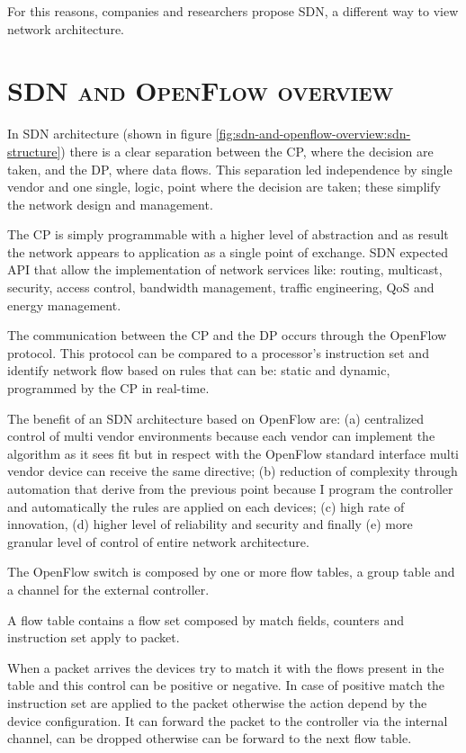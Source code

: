 For this reasons, companies and researchers propose \ac{SDN}, a different way to view network architecture.

\section*{\small \textsc{\ac{SDN} and OpenFlow overview}}
In \ac{SDN} architecture (shown in figure \ref{fig:sdn-and-openflow-overview:sdn-structure}) there is a clear separation between the \ac{CP}, where the decision are taken, and the \ac{DP}, where data flows. This separation led independence by single vendor and one single, logic, point where the decision are taken; these simplify the network design and management.

The \ac{CP} is simply programmable with a higher level of abstraction and as result the network appears to application as a single point of exchange.
\ac{SDN} expected \ac{API} that allow the implementation of network services like: routing, multicast, security, access control, bandwidth management, traffic engineering, \ac{QoS} and energy management.

The communication between the \ac{CP} and the \ac{DP} occurs through the OpenFlow protocol. This protocol can be compared to a processor's instruction set and identify network flow based on rules that can be: static and dynamic, programmed by the \ac{CP} in real-time.

The benefit of an \ac{SDN} architecture based on OpenFlow are: (a) centralized control of multi vendor environments because each vendor can implement the algorithm as it sees fit but in respect with the OpenFlow standard interface multi vendor device can receive the same directive; (b) reduction of complexity through automation that derive from the previous point because I program the controller and automatically the rules are applied on each devices; (c) high rate of innovation, (d) higher level of reliability and security and finally (e) more granular level of control of entire network architecture.

The OpenFlow switch is composed by one or more flow tables, a group table and a channel for the external controller.

A flow table contains a flow set composed by match fields, counters and instruction set apply to packet.

When a packet arrives the devices try to match it with the flows present in the table and this control can be positive or negative. In case of positive match the instruction set are applied to the packet otherwise the action depend by the device configuration. It can forward the packet to the controller via the internal channel, can be dropped otherwise can be forward to the next flow table.

